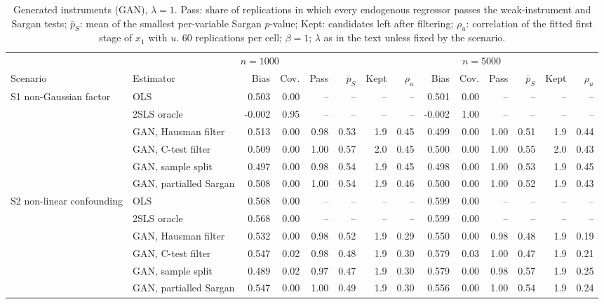 \begin{table}[p]
\centering
\scriptsize
\setlength{\tabcolsep}{2.5pt}
\caption{Generated instruments (GAN), $\lambda=1$. Pass: share of replications in which every endogenous regressor passes the weak-instrument and Sargan tests; $\bar p_S$: mean of the smallest per-variable Sargan $p$-value; Kept: candidates left after filtering; $\rho_u$: correlation of the fitted first stage of $x_1$ with $u$.  60 replications per cell; $\beta=1$; $\lambda$ as in the text unless fixed by the scenario.}\label{tab:mc-gan}
\begin{tabular}{@{}llrrrrrrrrrrrr@{}}
\toprule
 & \multicolumn{6}{c}{$n=1000$} & \multicolumn{6}{c}{$n=5000$} \\
\cmidrule(lr){3-8} \cmidrule(lr){9-14}
Scenario & Estimator & Bias & Cov. & Pass & $\bar p_S$ & Kept & $\rho_u$ & Bias & Cov. & Pass & $\bar p_S$ & Kept & $\rho_u$ \\
\midrule
S1 non-Gaussian factor & OLS & 0.503 & 0.00 & -- & -- & -- & -- & 0.501 & 0.00 & -- & -- & -- & -- \\
 & 2SLS oracle & -0.002 & 0.95 & -- & -- & -- & -- & -0.002 & 1.00 & -- & -- & -- & -- \\
 & GAN, Hausman filter & 0.513 & 0.00 & 0.98 & 0.53 & 1.9 & 0.45 & 0.499 & 0.00 & 1.00 & 0.51 & 1.9 & 0.44 \\
 & GAN, C-test filter & 0.509 & 0.00 & 1.00 & 0.57 & 2.0 & 0.45 & 0.500 & 0.00 & 1.00 & 0.55 & 2.0 & 0.43 \\
 & GAN, sample split & 0.497 & 0.00 & 0.98 & 0.54 & 1.9 & 0.45 & 0.498 & 0.00 & 1.00 & 0.53 & 1.9 & 0.45 \\
 & GAN, partialled Sargan & 0.508 & 0.00 & 1.00 & 0.54 & 1.9 & 0.46 & 0.500 & 0.00 & 1.00 & 0.52 & 1.9 & 0.43 \\
\addlinespace
S2 non-linear confounding & OLS & 0.568 & 0.00 & -- & -- & -- & -- & 0.599 & 0.00 & -- & -- & -- & -- \\
 & 2SLS oracle & 0.568 & 0.00 & -- & -- & -- & -- & 0.599 & 0.00 & -- & -- & -- & -- \\
 & GAN, Hausman filter & 0.532 & 0.00 & 0.98 & 0.52 & 1.9 & 0.29 & 0.550 & 0.00 & 0.98 & 0.48 & 1.9 & 0.19 \\
 & GAN, C-test filter & 0.547 & 0.02 & 0.98 & 0.48 & 1.9 & 0.30 & 0.579 & 0.03 & 1.00 & 0.47 & 1.9 & 0.21 \\
 & GAN, sample split & 0.489 & 0.02 & 0.97 & 0.47 & 1.9 & 0.30 & 0.579 & 0.00 & 0.98 & 0.57 & 1.9 & 0.25 \\
 & GAN, partialled Sargan & 0.547 & 0.00 & 1.00 & 0.49 & 1.9 & 0.30 & 0.556 & 0.00 & 1.00 & 0.54 & 1.9 & 0.24 \\

\end{tabular}
\end{table}
